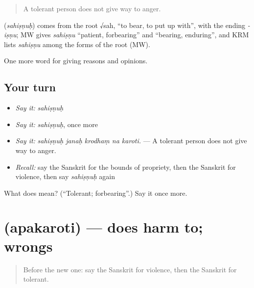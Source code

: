 \begin{quote}
A tolerant person does not give way to anger.
\end{quote}

\begin{cousinweb}
\textbf{} (\emph{sahiṣṇuḥ}) comes from the root √sah, \textquotedblleft{}to bear, to put up with\textquotedblright{}, with the ending \emph{-iṣṇu}; MW gives \emph{sahiṣṇu} \textquotedblleft{}patient, forbearing\textquotedblright{} and \textquotedblleft{}bearing, enduring\textquotedblright{}, and KRM lists \emph{sahiṣṇu} among the forms of the root (MW).
\end{cousinweb}

\begin{grammarlens}[title={What you've built}]
One more word for giving reasons and opinions.
\end{grammarlens}

\subsection*{Your turn}
\begin{itemize}
\raggedright
  \item \emph{Say it:} \emph{sahiṣṇuḥ}
  \item \emph{Say it:} \emph{sahiṣṇuḥ}, once more
  \item \emph{Say it:} \emph{sahiṣṇuḥ janaḥ krodhaṃ na karoti.} — A tolerant person does not give way to anger.
  \item \emph{Recall:} say the Sanskrit for the bounds of propriety, then the Sanskrit for violence, then say \emph{sahiṣṇuḥ} again
\end{itemize}

\begin{tcolorbox}[breakable,colback=teal!4,colframe=teal!35!black,title={Before you move on}]
What does  mean? (\textquotedblleft{}Tolerant; forbearing\textquotedblright{}.) Say it once more.
\end{tcolorbox}
\section[\texorpdfstring{\sk{अपकरोति} (apakaroti)}{अपकरोति (apakaroti)}]{ (apakaroti) — does harm to; wrongs}

\label{lesson:SA-C352-apakaroti}



\begin{quote}
Before the new one: say the Sanskrit for violence, then the Sanskrit for tolerant.
\end{quote}

